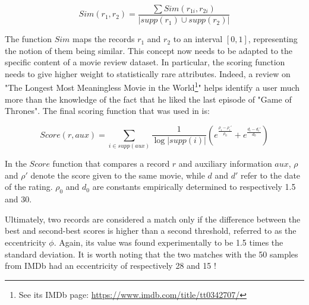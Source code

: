 \begin{equation}
	Sim(r_1, r_2) = \frac{\sum Sim(r_{1i}, r_{2i})}{\lvert supp(r_1) \cup supp(r_2) \rvert}
\end{equation} 

The function $Sim$ maps the records $r_1$ and $r_2$ to an interval $[0,1]$, representing the notion of them being similar. This concept now needs to be adapted to the specific content of a movie review dataset. In particular, the scoring function needs to give higher weight to statistically rare attributes. Indeed, a review on "The Longest Most Meaningless Movie in the World\footnote{See its IMDb page: \url{https://www.imdb.com/title/tt0342707/}}" helps identify a user much more than the knowledge of the fact that he liked the last episode of "Game of Thrones". The final scoring function that was used in \cite{netflix} is:

\begin{equation}
	Score(r,aux) = \sum_{i \in supp(aux)} \frac{1}{\log\lvert supp(i) \rvert} \left( e^{\frac{\rho_i - \rho_i' }{\rho_0}} + e^{\frac{d_i - d_i' }{d_0}}\right)
\end{equation}

In the $Score$ function that compares a record $r$ and auxiliary information $aux$, $\rho$ and $\rho'$ denote the score given to the same movie, while $d$ and $d'$ refer to the date of the rating. $\rho_0$ and $d_0$ are constants empirically determined to respectively 1.5 and 30.

Ultimately, two records are considered a match only if the difference between the best and second-best scores is higher than a second threshold, referred to as the eccentricity $\phi$. Again, its value was found experimentally to be 1.5 times the standard deviation. It is worth noting that the two matches with the 50 samples from IMDb had an eccentricity of respectively 28 and 15 ! 
 

